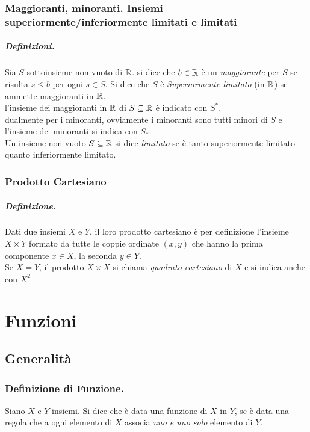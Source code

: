 \documentclass[12pt, a4paper, openany]{book}
\begin{document}
\subsection*{Maggioranti, minoranti. Insiemi superiormente/inferiormente limitati e limitati}
\paragraph{Definizioni.} Sia $S$ sottoinsieme non vuoto di $\mathbb{R}$. si dice che $b\in \mathbb{R}$ è un \emph{maggiorante} per $S$ se risulta $s\leq b$ per ogni $s \in S$. Si dice che $S$ è \emph{Superiormente limitato} (in $\mathbb{R}$) se ammette maggioranti in $\mathbb{R}$.
\\l'insieme dei maggioranti in $\mathbb{R}$ di $S\subseteq \mathbb{R}$ è indicato con $S^*$.
\\dualmente per i minoranti, ovviamente i minoranti sono tutti minori di $S$ e l'insieme dei minoranti si indica con $S_*$.
\\Un insieme non vuoto $S \subseteq \mathbb{R}$ si dice \emph{limitato} se è tanto superiormente limitato quanto inferiormente limitato. 
\subsection*{Prodotto Cartesiano}
\paragraph{Definizione.}Dati due insiemi $X$ e $Y$, il loro prodotto cartesiano è per definizione l'insieme $X \times Y$ formato da tutte le coppie ordinate $(x,y)$ che hanno la prima componente $x \in X$, la seconda $y \in Y$.\\
Se $X = Y$, il prodotto $X \times X$ si chiama \emph{quadrato cartesiano} di $X$ e si indica anche con $X^2$

\chapter{Funzioni}

\section{Generalità}

\subsection{Definizione di Funzione.} Siano $X$ e $Y$ insiemi. Si dice che è data una funzione di $X$ in $Y$, se è data una regola che a ogni elemento di $X$ associa \emph{uno e uno solo} elemento di $Y$.
\end{document}
